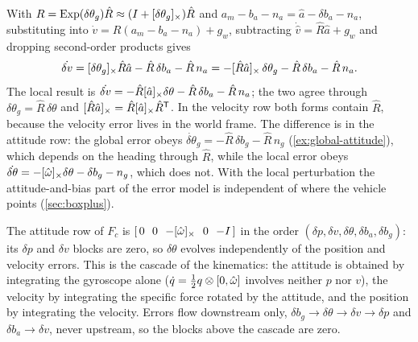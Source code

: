 \begin{solutions}
  \item \ifsolutions
        With $R = \operatorname{Exp}(\delta\theta_g)\hat R \approx (I + [\delta\theta_g]_{\times})\hat R$ and $a_m - b_a - n_a = \hat a - \delta b_a - n_a$, substituting into
        $\dot v = R(a_m - b_a - n_a) + g_w$, subtracting $\dot{\hat v} = \hat R\hat a + g_w$ and dropping second-order products gives
        \[
          \dot{\delta v} = [\delta\theta_g]_{\times}\hat R\hat a - \hat R\,\delta b_a - \hat R\,n_a = -[\hat R\hat a]_{\times}\,\delta\theta_g - \hat R\,\delta b_a - \hat R\,n_a .
        \]
        The local result is $\dot{\delta v} = -\hat R[\hat a]_{\times}\delta\theta - \hat R\,\delta b_a - \hat R\,n_a$; the two agree through $\delta\theta_g = \hat R\,\delta\theta$ and
        $[\hat R\hat a]_{\times} = \hat R[\hat a]_{\times}\hat R^{\mathsf{T}}$. In the velocity row both forms contain $\hat R$, because the velocity error lives in the world frame. The difference
        is in the attitude row: the global error obeys $\dot{\delta\theta}_g = -\hat R\,\delta b_g - \hat R\,n_g$ (\cref{ex:global-attitude}), which depends on the heading through $\hat R$,
        while the local error obeys $\dot{\delta\theta} = -[\hat\omega]_{\times}\delta\theta - \delta b_g - n_g$, which does not. With the local perturbation the attitude-and-bias
        part of the error model is independent of where the vehicle points (\cref{sec:boxplus}).
        \else\withheldsolution\fi

  \item \ifsolutions
        The attitude row of $F_c$ is $[\,0\ \ 0\ \ {-\sx{\hat\omega}}\ \ 0\ \ {-I}\,]$ in the order $(\delta p, \delta v, \delta\theta, \delta b_a, \delta b_g)$: its $\delta p$ and $\delta v$ blocks are zero, so
        $\delta\theta$ evolves independently of the position and velocity errors. This is the cascade of the kinematics: the attitude is obtained by
        integrating the gyroscope alone ($\dot q = \tfrac12q\otimes[0, \hat\omega]$ involves neither $p$ nor $v$), the velocity by integrating the specific force rotated
        by the attitude, and the position by integrating the velocity. Errors flow downstream only, $\delta b_g \to \delta\theta \to \delta v \to \delta p$ and $\delta b_a \to \delta v$, never
        upstream, so the blocks above the cascade are zero.
        \else\withheldsolution\fi


\end{solutions}

